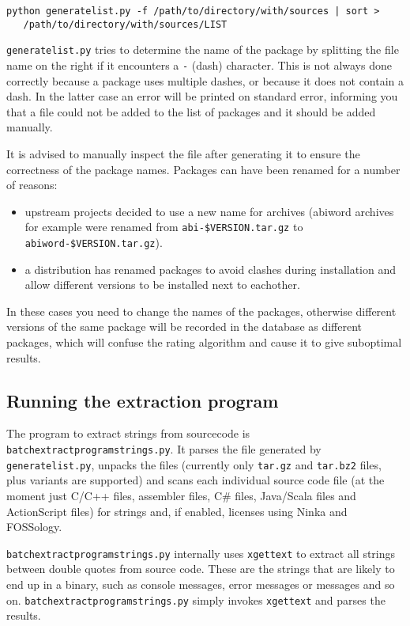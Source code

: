 \documentclass[10pt]{article}
\begin{document}
\begin{verbatim}
python generatelist.py -f /path/to/directory/with/sources | sort >
   /path/to/directory/with/sources/LIST
\end{verbatim}


\texttt{generatelist.py} tries to determine the name of the package by
splitting the file name on the right if it encounters a \texttt{-} (dash)
character. This is not always done correctly because a package uses multiple
dashes, or because it does not contain a dash. In the latter case an error
will be printed on standard error, informing you that a file could not be
added to the list of packages and it should be added manually.

It is advised to manually inspect the file after generating it to ensure the
correctness of the package names. Packages can have been renamed for a number
of reasons:

\begin{itemize}
\item upstream projects decided to use a new name for archives (abiword
archives for example were renamed from \texttt{abi-\$VERSION.tar.gz} to
\texttt{abiword-\$VERSION.tar.gz}).
\item a distribution has renamed packages to avoid clashes during installation
and allow different versions to be installed next to eachother.
\end{itemize}

In these cases you need to change the names of the packages, otherwise
different versions of the same package will be recorded in the database as
different packages, which will confuse the rating algorithm and cause it to
give suboptimal results.


\subsection{Running the extraction program}

The program to extract strings from sourcecode is
\texttt{batchextractprogramstrings.py}. It parses the file generated by
\texttt{generatelist.py}, unpacks the files (currently only \texttt{tar.gz}
and \texttt{tar.bz2} files, plus variants are supported) and scans each
individual source code file (at the moment just C/C++ files, assembler files,
C\# files, Java/Scala files and ActionScript files) for strings and, if
enabled, licenses using Ninka and FOSSology.

\texttt{batchextractprogramstrings.py} internally uses \texttt{xgettext} to
extract all strings between double quotes from source code. These are the
strings that are likely to end up in a binary, such as console messages, error
messages or messages and so on. \texttt{batchextractprogramstrings.py} simply
invokes \texttt{xgettext} and parses the results.
\end{document}
